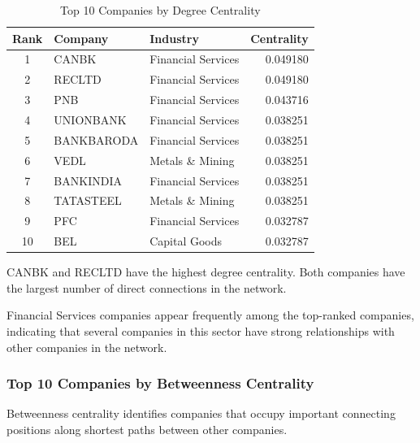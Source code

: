 \documentclass[11pt,a4paper]{article}
\begin{document}
\begin{table}[H]
\centering
\caption{Top 10 Companies by Degree Centrality}
\label{tab:degree_centrality}
\small
\begin{tabular}{cllr}
\toprule
\textbf{Rank} & \textbf{Company} & \textbf{Industry} &
\textbf{Centrality}\\
\midrule
1 & CANBK & Financial Services & 0.049180\\
2 & RECLTD & Financial Services & 0.049180\\
3 & PNB & Financial Services & 0.043716\\
4 & UNIONBANK & Financial Services & 0.038251\\
5 & BANKBARODA & Financial Services & 0.038251\\
6 & VEDL & Metals \& Mining & 0.038251\\
7 & BANKINDIA & Financial Services & 0.038251\\
8 & TATASTEEL & Metals \& Mining & 0.038251\\
9 & PFC & Financial Services & 0.032787\\
10 & BEL & Capital Goods & 0.032787\\
\bottomrule
\end{tabular}
\end{table}

CANBK and RECLTD have the highest degree centrality.
Both companies have the largest number of direct
connections in the network.

Financial Services companies appear frequently among
the top-ranked companies, indicating that several
companies in this sector have strong relationships
with other companies in the network.

\subsubsection{Top 10 Companies by Betweenness Centrality}

Betweenness centrality identifies companies that
occupy important connecting positions along shortest
paths between other companies.
\end{document}
